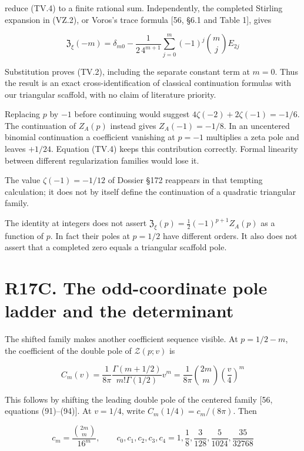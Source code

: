 \documentclass[
  11pt,
]{book}
\begin{document}
reduce (TV.4) to a finite rational sum. Independently, the completed
Stirling expansion in (VZ.2), or Voros's trace formula {[}56, §6.1 and
Table 1{]}, gives

\[
\boxed{\mathfrak Z_\xi(-m)=\delta_{m0}
-\frac1{2\,4^{m+1}}
\sum_{j=0}^m(-1)^j\binom mj E_{2j}}
\tag{TV.6}
\]

Substitution proves (TV.2), including the separate constant term at
\(m=0\). Thus the result is an exact cross-identification of classical
continuation formulas with our triangular scaffold, with no claim of
literature priority.

Replacing \(p\) by \(-1\) before continuing would suggest
\(4\zeta(-2)+2\zeta(-1)=-1/6\). The continuation of \(Z_A(p)\) instead
gives \(Z_A(-1)=-1/8\). In an uncentered binomial continuation a
coefficient vanishing at \(p=-1\) multiplies a zeta pole and leaves
\(+1/24\). Equation (TV.4) keeps this contribution correctly. Formal
linearity between different regularization families would lose it.

The value \(\zeta(-1)=-1/12\) of Dossier §172 reappears in that tempting
calculation; it does not by itself define the continuation of a
quadratic triangular family.

The identity at integers does not assert
\(\mathfrak Z_\xi(p)=\tfrac12(-1)^{p+1}Z_A(p)\) as a function of \(p\).
In fact their poles at \(p=1/2\) have different orders. It also does not
assert that a completed zero equals a triangular scaffold pole.

\section{R17C. The odd-coordinate pole ladder and the
determinant}\label{r17c.-the-odd-coordinate-pole-ladder-and-the-determinant}

The shifted family makes another coefficient sequence visible. At
\(p=1/2-m\), the coefficient of the double pole of \(\mathcal Z(p;v)\)
is

\[
C_m(v)=\frac1{8\pi}\frac{\Gamma(m+1/2)}{m!\Gamma(1/2)}v^m
=\frac1{8\pi}\binom{2m}{m}\left(\frac v4\right)^m
\tag{PC.1}
\]

This follows by shifting the leading double pole of the centered family
{[}56, equations (91)--(94){]}. At \(v=1/4\), write
\(C_m(1/4)=c_m/(8\pi)\). Then

\[
\boxed{c_m=\frac{\binom{2m}{m}}{16^m},\qquad
c_0,c_1,c_2,c_3,c_4=1,\frac18,\frac3{128},\frac5{1024},\frac{35}{32768}}
\tag{PC.2}
\]
\end{document}
